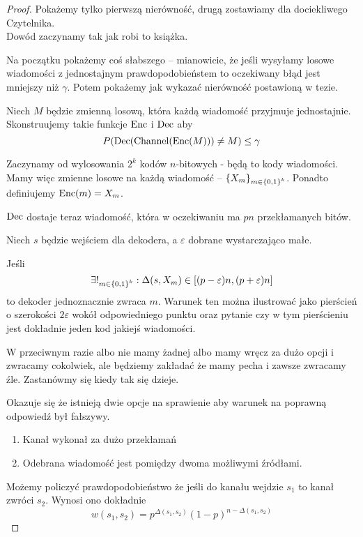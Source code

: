 \begin{proof}
    Pokażemy tylko pierwszą nierówność, drugą zostawiamy dla dociekliwego Czytelnika. \\
    Dowód zaczynamy tak jak robi to książka.
    
    Na początku pokażemy coś słabszego -- mianowicie, że jeśli wysyłamy losowe wiadomości z jednostajnym prawdopodobieństem to oczekiwany błąd jest mniejszy niż \( \gamma \).
    Potem pokażemy jak wykazać nierówność postawioną w tezie.
    
    Niech \( M \) będzie zmienną losową, która każdą wiadomość przyjmuje jednostajnie.
    Skonstruujemy takie funkcje \( \operatorname{Enc} \) i \( \operatorname{Dec} \) aby
    \[
        P\pars{\Dec(\Channel(\Enc(M))) \neq M} \leq \gamma
    \]
    
    Zaczynamy od wylosowania \( 2^k \) kodów \(n\)-bitowych - będą to kody wiadomości.
    Mamy więc zmienne losowe na każdą wiadomość -- \( \set{X_m}_{m \in \set{0, 1}^k} \).
    Ponadto definiujemy \( \operatorname{Enc}(m) = X_m \).
    
    \( \operatorname{Dec} \) dostaje teraz wiadomość, która w oczekiwaniu ma \( pn \) przekłamanych bitów. 
    
    Niech \( s \) będzie wejściem dla dekodera, a \( \varepsilon \) dobrane wystarczająco małe.
    
    Jeśli 
    \[
        \exists!_{m \in \set{0, 1}^k} : \Delta(s, X_m) \in \brackets{(p-\varepsilon)n, (p+\varepsilon)n}
    \]
    to dekoder jednoznacznie zwraca \( m \).
    Warunek ten można ilustrować jako pierścień o szerokości \( 2\varepsilon \) wokół odpowiedniego punktu oraz pytanie czy w tym pierścieniu jest dokładnie jeden kod jakiejś wiadomości.
    
    W przeciwnym razie albo nie mamy żadnej albo mamy wręcz za dużo opcji i zwracamy cokolwiek, ale będziemy zakładać że mamy pecha i zawsze zwracamy źle.
    Zastanówmy się kiedy tak się dzieje.
    
    Okazuje się że istnieją dwie opcje na sprawienie aby warunek na poprawną odpowiedź był fałszywy.
    \begin{enumerate}
        \item Kanał wykonał za dużo przekłamań
        \item Odebrana wiadomość jest pomiędzy dwoma możliwymi źródłami.
    \end{enumerate}
    
    Możemy policzyć prawdopodobieństwo że jeśli do kanału wejdzie \( s_1 \) to kanał zwróci \( s_2 \).
    Wynosi ono dokładnie
    \[
        w(s_1, s_2) = p^{\Delta(s_1, s_2)} (1-p)^{n - \Delta(s_1, s_2)}
    \]
    

\end{proof}
